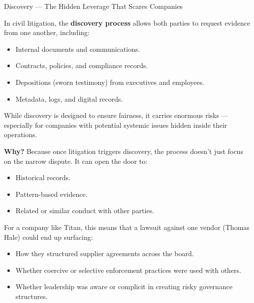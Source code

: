 \begin{HistoricalSidebar}{Discovery --- The Hidden Leverage That Scares Companies}

    In civil litigation, the \textbf{discovery process} allows both parties to request evidence from one another, including:

    \medskip

    \begin{itemize}
        \item Internal documents and communications.
        \item Contracts, policies, and compliance records.
        \item Depositions (sworn testimony) from executives and employees.
        \item Metadata, logs, and digital records.
    \end{itemize}

    \medskip
    
    While discovery is designed to ensure fairness, it carries enormous risks — especially for companies with potential systemic issues hidden inside their operations.
    
    \medskip
    
    \textbf{Why?} Because once litigation triggers discovery, the process doesn’t just focus on the narrow dispute.
    It can open the door to:

    \medskip

    \begin{itemize}
        \item Historical records.
        \item Pattern-based evidence.
        \item Related or similar conduct with other parties.
    \end{itemize}

    \medskip
    
    For a company like Titan, this means that a lawsuit against one vendor (Thomas Hale) could end up surfacing:

    \medskip

    \begin{itemize}
        \item How they structured supplier agreements across the board.
        \item Whether coercive or selective enforcement practices were used with others.
        \item Whether leadership was aware or complicit in creating risky governance structures.
    \end{itemize}
    

\end{HistoricalSidebar}

